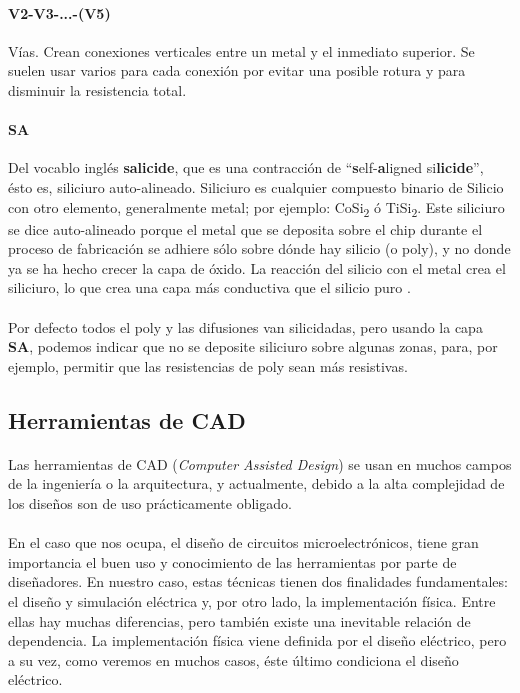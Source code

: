 \paragraph{V2-V3-...-(V5)}
Vías. Crean conexiones verticales entre un metal y el
inmediato superior. Se suelen usar varios para cada conexión por evitar una
posible rotura y para disminuir la resistencia total.

\paragraph{SA}
Del vocablo inglés \textbf{salicide}, que es una contracción de ``\textbf{s}elf-\textbf{a}ligned si\textbf{licide}'',
ésto es, siliciuro auto-alineado. Siliciuro es cualquier compuesto binario de
Silicio con otro elemento, generalmente metal; por ejemplo: CoSi\textsubscript{2}
ó TiSi\textsubscript{2}. Este siliciuro se dice auto-alineado porque el metal que
se deposita sobre el chip durante el proceso de fabricación se adhiere sólo sobre
dónde hay silicio (o poly), y no donde ya se ha hecho crecer la capa de óxido.
La reacción del silicio con el metal crea el siliciuro, lo que crea una capa más
conductiva que el silicio puro \cite{Maex:silicides}.

\paragraph{}
Por defecto todos el poly y las difusiones van silicidadas, pero usando la capa \textbf{SA},
podemos indicar que no se deposite siliciuro sobre algunas zonas, para, por ejemplo,
permitir que las resistencias de poly sean más resistivas.

\subsection{Herramientas de CAD}

\paragraph{}
Las herramientas de CAD (\textit{Computer Assisted Design}) se usan
en muchos campos de la ingeniería o la arquitectura, y actualmente, debido a la alta
complejidad de los diseños son de uso prácticamente obligado.

\paragraph{}
En el caso que nos ocupa, el diseño de circuitos microelectrónicos,
tiene gran importancia el buen uso y conocimiento de las herramientas por parte de
diseñadores. En nuestro caso, estas técnicas tienen dos finalidades fundamentales:
el diseño y simulación eléctrica y, por otro lado, la implementación física. Entre ellas
hay muchas diferencias, pero también existe una inevitable relación de dependencia.
La implementación física viene definida por el diseño eléctrico, pero a su vez, como
veremos en muchos casos, éste último condiciona el diseño eléctrico.


